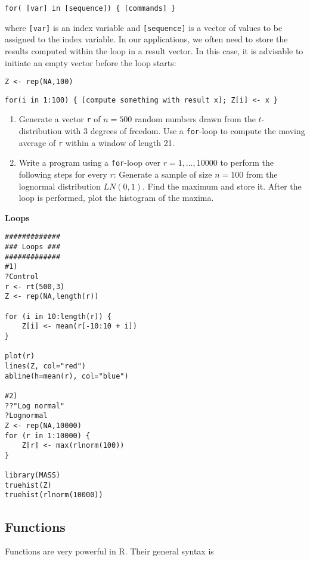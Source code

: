 \documentclass{article}
\begin{document}
\texttt{for(~[var] in [sequence]) \{ [commands] \}}

where \texttt{[var]} is an index variable and \texttt{[sequence]} is a vector of values to be assigned to the index variable. In our applications, we often need to store the results computed within the loop in a result vector. In this case, it is advisable to initiate an empty vector before the loop starts:

\texttt{Z <- rep(NA,100)}

\texttt{for(i in 1:100) \{ [compute something with result x]; Z[i] <- x \}}

\begin{enumerate}\setlength{\itemsep}{-1pt}
\item Generate a vector \texttt{r} of $n=500$ random numbers drawn from the $t$-distribution with 3 degrees of freedom. Use a \texttt{for}-loop to compute the moving average of \texttt{r} within a window of length 21.

\item Write a program using a \texttt{for}-loop over $r=1,\ldots ,10000$ to perform the following steps for every $r$: Generate a sample of size $n=100$ from the lognormal distribution $LN(0,1)$. Find the maximum and store it. After the loop is performed, plot the histogram of the maxima.
\end{enumerate}

\begin{solution}
\textbf{Loops}

\begin{verbatim}
#############
### Loops ###
#############
#1)
?Control
r <- rt(500,3)
Z <- rep(NA,length(r))

for (i in 10:length(r)) {
    Z[i] <- mean(r[-10:10 + i])
}

plot(r)
lines(Z, col="red")
abline(h=mean(r), col="blue")

#2)
??"Log normal"
?Lognormal
Z <- rep(NA,10000)
for (r in 1:10000) {
	Z[r] <- max(rlnorm(100))
}

library(MASS)
truehist(Z)
truehist(rlnorm(10000))
\end{verbatim}
\end{solution}

\subsection{Functions}

Functions are very powerful in R. Their general syntax is
\end{document}
